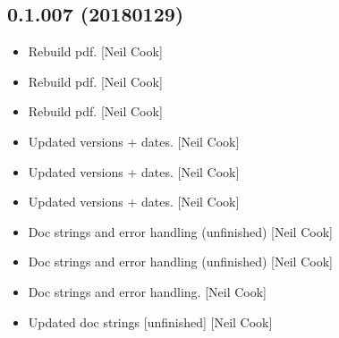 \documentclass[a4paper,10pt,english]{report}
\begin{document}
\subsection{0.1.007 (2018\sphinxhyphen{}01\sphinxhyphen{}29)}
\label{\detokenize{misc/changelog:id516}}\begin{itemize}
\item {} 
Rebuild pdf. {[}Neil Cook{]}

\item {} 
Rebuild pdf. {[}Neil Cook{]}

\item {} 
Rebuild pdf. {[}Neil Cook{]}

\item {} 
Updated versions + dates. {[}Neil Cook{]}

\item {} 
Updated versions + dates. {[}Neil Cook{]}

\item {} 
Updated versions + dates. {[}Neil Cook{]}

\item {} 
Doc strings and error handling (unfinished) {[}Neil Cook{]}

\item {} 
Doc strings and error handling (unfinished) {[}Neil Cook{]}

\item {} 
Doc strings and error handling. {[}Neil Cook{]}

\item {} 
Updated doc strings {[}unfinished{]} {[}Neil Cook{]}

\end{itemize}
\end{document}
